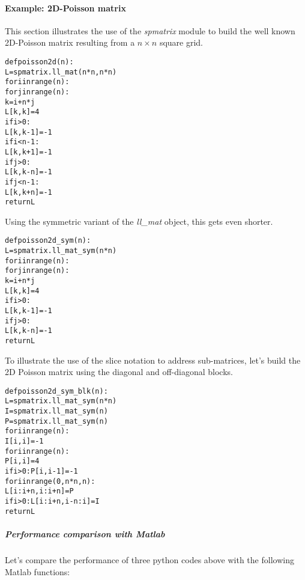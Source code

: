 \documentclass[a4paper]{article}
\newlength{\pyindent} \newlength{\pyminipagewidth}
\newenvironment{pycode}{\begin{trivlist}\item\hspace*{\pyindent}\begin{minipage}{\pyminipagewidth}\small\begin{alltt}}
      {\end{alltt}\end{minipage}\end{trivlist}}
\begin{document}
\paragraph{Example: 2D-Poisson matrix}
%
This section illustrates the use of the \textit{spmatrix} module to
build the well known 2D-Poisson matrix resulting from a $n \times n$
square grid.
\begin{pycode}
def poisson2d(n):
    L = spmatrix.ll_mat(n*n, n*n)
    for i in range(n):
        for j in range(n):
            k = i + n*j
            L[k,k] = 4
            if i > 0:
                L[k,k-1] = -1
            if i < n-1:
                L[k,k+1] = -1
            if j > 0:
                L[k,k-n] = -1
            if j < n-1:
                L[k,k+n] = -1
    return L
\end{pycode} 
Using the symmetric variant of the \textit{ll\_mat} object, this gets
even shorter.
\begin{pycode}
def poisson2d_sym(n):
    L = spmatrix.ll_mat_sym(n*n)
    for i in range(n):
        for j in range(n):
            k = i + n*j
            L[k,k] = 4
            if i > 0:
                L[k,k-1] = -1
            if j > 0:
                L[k,k-n] = -1
    return L
\end{pycode}
To illustrate the use of the slice notation to address sub-matrices,
let's build the 2D Poisson matrix using the diagonal and off-diagonal
blocks.
\begin{pycode}
def poisson2d_sym_blk(n):
    L = spmatrix.ll_mat_sym(n*n)
    I = spmatrix.ll_mat_sym(n)
    P = spmatrix.ll_mat_sym(n)
    for i in range(n):
        I[i,i] = -1
    for i in range(n):
        P[i,i] = 4
        if i > 0: P[i,i-1] = -1
    for i in range(0, n*n, n):
        L[i:i+n,i:i+n] = P
        if i > 0: L[i:i+n,i-n:i] = I
    return L
\end{pycode}

\subparagraph{Performance comparison with Matlab}
%
Let's compare the performance of three python codes above with the
following Matlab functions:
\end{document}
